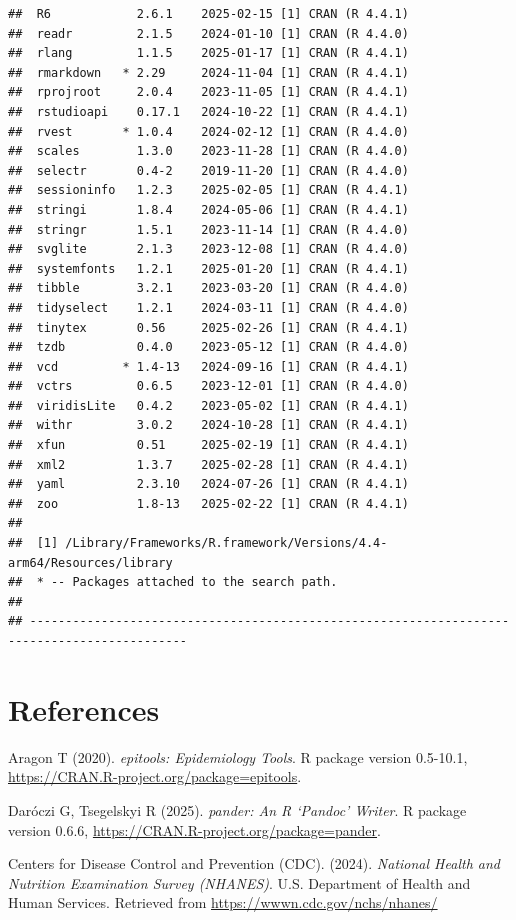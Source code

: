 \documentclass[
]{article}
\begin{document}
\begin{verbatim}
##  R6            2.6.1    2025-02-15 [1] CRAN (R 4.4.1)
##  readr         2.1.5    2024-01-10 [1] CRAN (R 4.4.0)
##  rlang         1.1.5    2025-01-17 [1] CRAN (R 4.4.1)
##  rmarkdown   * 2.29     2024-11-04 [1] CRAN (R 4.4.1)
##  rprojroot     2.0.4    2023-11-05 [1] CRAN (R 4.4.1)
##  rstudioapi    0.17.1   2024-10-22 [1] CRAN (R 4.4.1)
##  rvest       * 1.0.4    2024-02-12 [1] CRAN (R 4.4.0)
##  scales        1.3.0    2023-11-28 [1] CRAN (R 4.4.0)
##  selectr       0.4-2    2019-11-20 [1] CRAN (R 4.4.0)
##  sessioninfo   1.2.3    2025-02-05 [1] CRAN (R 4.4.1)
##  stringi       1.8.4    2024-05-06 [1] CRAN (R 4.4.1)
##  stringr       1.5.1    2023-11-14 [1] CRAN (R 4.4.0)
##  svglite       2.1.3    2023-12-08 [1] CRAN (R 4.4.0)
##  systemfonts   1.2.1    2025-01-20 [1] CRAN (R 4.4.1)
##  tibble        3.2.1    2023-03-20 [1] CRAN (R 4.4.0)
##  tidyselect    1.2.1    2024-03-11 [1] CRAN (R 4.4.0)
##  tinytex       0.56     2025-02-26 [1] CRAN (R 4.4.1)
##  tzdb          0.4.0    2023-05-12 [1] CRAN (R 4.4.0)
##  vcd         * 1.4-13   2024-09-16 [1] CRAN (R 4.4.1)
##  vctrs         0.6.5    2023-12-01 [1] CRAN (R 4.4.0)
##  viridisLite   0.4.2    2023-05-02 [1] CRAN (R 4.4.1)
##  withr         3.0.2    2024-10-28 [1] CRAN (R 4.4.1)
##  xfun          0.51     2025-02-19 [1] CRAN (R 4.4.1)
##  xml2          1.3.7    2025-02-28 [1] CRAN (R 4.4.1)
##  yaml          2.3.10   2024-07-26 [1] CRAN (R 4.4.1)
##  zoo           1.8-13   2025-02-22 [1] CRAN (R 4.4.1)
## 
##  [1] /Library/Frameworks/R.framework/Versions/4.4-arm64/Resources/library
##  * -- Packages attached to the search path.
## 
## --------------------------------------------------------------------------------------------
\end{verbatim}

\section{References}\label{references}

Aragon T (2020). \emph{epitools: Epidemiology Tools}. R package version
0.5-10.1, \url{https://CRAN.R-project.org/package=epitools}.

Daróczi G, Tsegelskyi R (2025). \emph{pander: An R `Pandoc' Writer}. R
package version 0.6.6, \url{https://CRAN.R-project.org/package=pander}.

Centers for Disease Control and Prevention (CDC). (2024). \emph{National
Health and Nutrition Examination Survey (NHANES)}. U.S. Department of
Health and Human Services. Retrieved from
\url{https://wwwn.cdc.gov/nchs/nhanes/}
\end{document}
